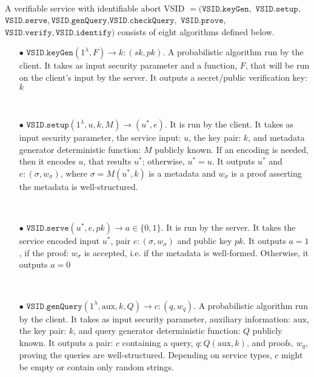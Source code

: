 \



\begin{definition}\label{service-def} A verifiable service with identifiable abort  VSID $=(\mathtt{VSID.keyGen}, $ $\mathtt{VSID.setup}, $ $\mathtt{VSID.serve},\mathtt{VSID.genQuery}$,$\mathtt{VSID.checkQuery},$ $\mathtt{VSID.prove},$ $\mathtt{VSID.verify}, \mathtt{VSID.identify})$ consists of eight algorithms defined below.


\begin{itemize}
\item[$\bullet$] $\mathtt{VSID.keyGen}(1^{\lambda},F)\rightarrow k:(sk,pk)$.  A probabilistic algorithm run by the client. It takes as input security parameter and a function, $F$, that will be run on the client's input by the server. It outputs a secret/public verification key: $k$ 

\

\item[$\bullet$] $\mathtt{VSID.setup}(1^{\lambda}, u,k,M)\rightarrow (u^{\scriptscriptstyle *},e)$. It is run by the client. It takes as input security parameter,  the service  input: $u$,  the key pair: $k$, and  metadata generator deterministic function: $M$ publicly known. If an encoding is needed, then it encodes $u$, that results $u^{\scriptscriptstyle *}$; otherwise, $u^{\scriptscriptstyle *}=u$. It outputs  $u^{\scriptscriptstyle *}$ and $e:(\sigma,w_{\sigma})$, where $\sigma=M(u^{\scriptscriptstyle *},k)$ is a metadata and $w_{\sigma}$ is a proof asserting the metadata is well-structured.  

\

\item[$\bullet$] $\mathtt{VSID.serve}(u^{\scriptscriptstyle *},e,pk)\rightarrow a\in\{0,1\}$. It is run by the server. It takes the  service encoded input $u^{\scriptscriptstyle *}$, pair $e:(\sigma,w_{\sigma})$ and public key $pk$. It outputs $a=1$, if the proof: $w_{\sigma}$ is accepted, i.e. if the metadata is well-formed. Otherwise, it outputs $a=0$ 

\

\item[$\bullet$] $\mathtt{VSID.genQuery}(1^{\lambda},  \text{aux},k,Q)\rightarrow c:(q,w_{\scriptscriptstyle q})$. A probabilistic algorithm run by the client. It takes as input security parameter, auxiliary information: $ \text{aux}$,  the key pair: $k$, and   query generator deterministic function: $Q$ publicly known. It outputs a pair: $c$ containing a query, $q:Q( \text{aux},k)$,  and proofs, $w_{q}$, proving the queries are well-structured. Depending on service types, $c$ might be  empty or  contain only random strings.


\end{itemize}
\end{definition}
